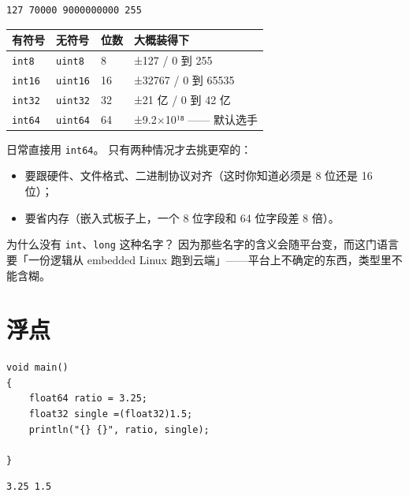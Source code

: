 \par
\medskip
\begin{lstlisting}[style=out]
127 70000 9000000000 255
\end{lstlisting}
\par
\medskip

\begin{center}
\begin{tabular}{llll}
\toprule
有符号 & 无符号 & 位数 & 大概装得下 \\
\midrule
\texttt{int8} & \texttt{uint8} & 8 & ±127 / 0 到 255 \\
\texttt{int16} & \texttt{uint16} & 16 & ±32767 / 0 到 65535 \\
\texttt{int32} & \texttt{uint32} & 32 & ±21 亿 / 0 到 42 亿 \\
\texttt{int64} & \texttt{uint64} & 64 & ±9.2\ensuremath{\times}10¹⁸ —— 默认选手 \\
\bottomrule
\end{tabular}
\end{center}

日常直接用 \texttt{int64}。 只有两种情况才去挑更窄的：

\begin{itemize}

\item 要跟硬件、文件格式、二进制协议对齐（这时你知道必须是 8 位还是 16 位）；

\item 要省内存（嵌入式板子上，一个 8 位字段和 64 位字段差 8 倍）。

\end{itemize}

为什么没有 \texttt{int}、\texttt{long} 这种名字？ 因为那些名字的含义会随平台变，而这门语言要「一份逻辑从 embedded Linux 跑到云端」——平台上不确定的东西，类型里不能含糊。

\section{浮点}

\par
\medskip
\begin{lstlisting}[style=chali]
void main()
{
    float64 ratio = 3.25;
    float32 single =(float32)1.5;
    println("{} {}", ratio, single);

}
\end{lstlisting}
\par
\medskip

\par
\medskip
\begin{lstlisting}[style=out]
3.25 1.5
\end{lstlisting}
\par
\medskip

